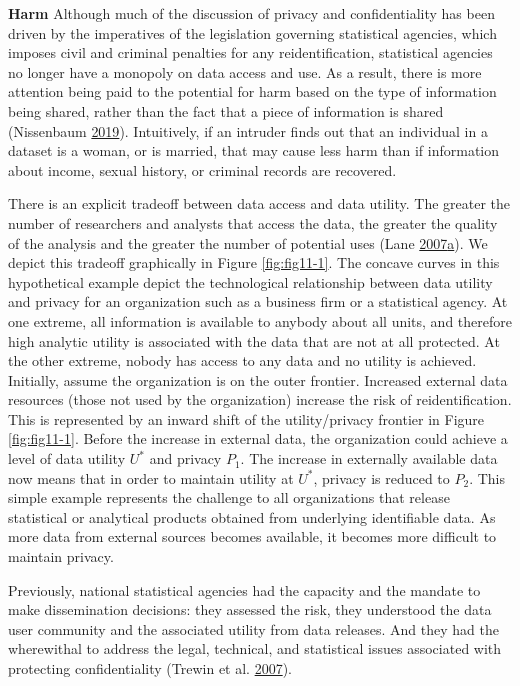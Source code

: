 \documentclass[]{krantz}
\begin{document}
\textbf{Harm} Although much of the discussion of privacy and
confidentiality has been driven by the imperatives of the legislation
governing statistical agencies, which imposes civil and criminal
penalties for any reidentification, statistical agencies no longer have
a monopoly on data access and use. As a result, there is more attention
being paid to the potential for harm based on the type of information
being shared, rather than the fact that a piece of information is shared
(Nissenbaum \protect\hyperlink{ref-nissenbaum2019contextual}{2019}).
Intuitively, if an intruder finds out that an individual in a dataset is
a woman, or is married, that may cause less harm than if information
about income, sexual history, or criminal records are recovered.

There is an explicit tradeoff between data access and data utility. The
greater the number of researchers and analysts that access the data, the
greater the quality of the analysis and the greater the number of
potential uses (Lane
\protect\hyperlink{ref-Lane2007a}{2007}\protect\hyperlink{ref-Lane2007a}{a}).
We depict this tradeoff graphically in Figure \ref{fig:fig11-1}. The
concave curves in this hypothetical example depict the technological
relationship between data utility and privacy for an organization such
as a business firm or a statistical agency. At one extreme, all
information is available to anybody about all units, and therefore high
analytic utility is associated with the data that are not at all
protected. At the other extreme, nobody has access to any data and no
utility is achieved. Initially, assume the organization is on the outer
frontier. Increased external data resources (those not used by the
organization) increase the risk of reidentification. This is represented
by an inward shift of the utility/privacy frontier in Figure
\ref{fig:fig11-1}. Before the increase in external data, the
organization could achieve a level of data utility \(U^*\) and privacy
\(P_1\). The increase in externally available data now means that in
order to maintain utility at \(U^*\), privacy is reduced to \(P_2\).
This simple example represents the challenge to all organizations that
release statistical or analytical products obtained from underlying
identifiable data. As more data from external sources becomes available,
it becomes more difficult to maintain privacy.

Previously, national statistical agencies had the capacity and the
mandate to make dissemination decisions: they assessed the risk, they
understood the data user community and the associated utility from data
releases. And they had the wherewithal to address the legal, technical,
and statistical issues associated with protecting confidentiality
(Trewin et al. \protect\hyperlink{ref-trewin2007managing}{2007}).
\end{document}
